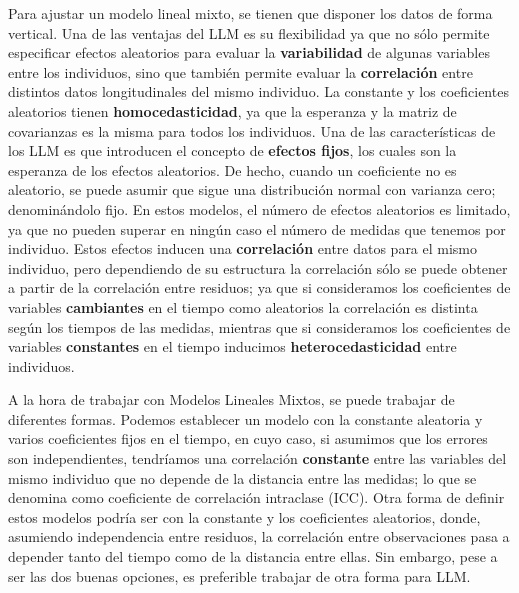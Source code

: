 \documentclass[
  letterpaper,
  DIV=11,
  numbers=noendperiod]{scrreprt}
\begin{document}
Para ajustar un modelo lineal mixto, se tienen que disponer los datos de
forma vertical. Una de las ventajas del LLM es su flexibilidad ya que no
sólo permite especificar efectos aleatorios para evaluar la
\textbf{variabilidad} de algunas variables entre los individuos, sino
que también permite evaluar la \textbf{correlación} entre distintos
datos longitudinales del mismo individuo. La constante y los
coeficientes aleatorios tienen \textbf{homocedasticidad}, ya que la
esperanza y la matriz de covarianzas es la misma para todos los
individuos. Una de las características de los LLM es que introducen el
concepto de \textbf{efectos fijos}, los cuales son la esperanza de los
efectos aleatorios. De hecho, cuando un coeficiente no es aleatorio, se
puede asumir que sigue una distribución normal con varianza cero;
denominándolo fijo. En estos modelos, el número de efectos aleatorios es
limitado, ya que no pueden superar en ningún caso el número de medidas
que tenemos por individuo. Estos efectos inducen una
\textbf{correlación} entre datos para el mismo individuo, pero
dependiendo de su estructura la correlación sólo se puede obtener a
partir de la correlación entre residuos; ya que si consideramos los
coeficientes de variables \textbf{cambiantes} en el tiempo como
aleatorios la correlación es distinta según los tiempos de las medidas,
mientras que si consideramos los coeficientes de variables
\textbf{constantes} en el tiempo inducimos \textbf{heterocedasticidad}
entre individuos.

A la hora de trabajar con Modelos Lineales Mixtos, se puede trabajar de
diferentes formas. Podemos establecer un modelo con la constante
aleatoria y varios coeficientes fijos en el tiempo, en cuyo caso, si
asumimos que los errores son independientes, tendríamos una correlación
\textbf{constante} entre las variables del mismo individuo que no
depende de la distancia entre las medidas; lo que se denomina como
coeficiente de correlación intraclase (ICC). Otra forma de definir estos
modelos podría ser con la constante y los coeficientes aleatorios,
donde, asumiendo independencia entre residuos, la correlación entre
observaciones pasa a depender tanto del tiempo como de la distancia
entre ellas. Sin embargo, pese a ser las dos buenas opciones, es
preferible trabajar de otra forma para LLM.
\end{document}
